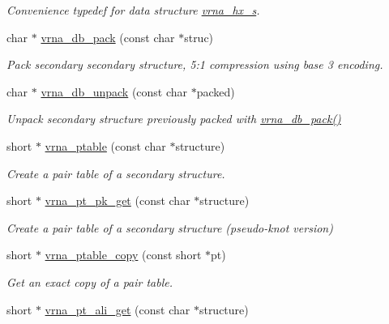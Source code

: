 \begin{DoxyCompactItemize}
\begin{DoxyCompactList}\small\item\em Convenience typedef for data structure \hyperlink{structvrna__hx__s}{vrna\+\_\+hx\+\_\+s}. \end{DoxyCompactList}\item 
char $\ast$ \hyperlink{group__struct__utils_ga55c4783060a1464f862f858d5599c9e1}{vrna\+\_\+db\+\_\+pack} (const char $\ast$struc)
\begin{DoxyCompactList}\small\item\em Pack secondary secondary structure, 5\+:1 compression using base 3 encoding. \end{DoxyCompactList}\item 
char $\ast$ \hyperlink{group__struct__utils_ga6490adff857d84ce06e6f379ae3a4512}{vrna\+\_\+db\+\_\+unpack} (const char $\ast$packed)
\begin{DoxyCompactList}\small\item\em Unpack secondary structure previously packed with \hyperlink{group__struct__utils_ga55c4783060a1464f862f858d5599c9e1}{vrna\+\_\+db\+\_\+pack()} \end{DoxyCompactList}\item 
short $\ast$ \hyperlink{group__struct__utils_gae829fb8bb7f694c12a9c0bbc34c77c60}{vrna\+\_\+ptable} (const char $\ast$structure)
\begin{DoxyCompactList}\small\item\em Create a pair table of a secondary structure. \end{DoxyCompactList}\item 
short $\ast$ \hyperlink{group__struct__utils_gacca520048b24ec5a8978f4dafb4e4bf8}{vrna\+\_\+pt\+\_\+pk\+\_\+get} (const char $\ast$structure)
\begin{DoxyCompactList}\small\item\em Create a pair table of a secondary structure (pseudo-\/knot version) \end{DoxyCompactList}\item 
short $\ast$ \hyperlink{group__struct__utils_ga2daefbbd6d9f8803731651882f54332d}{vrna\+\_\+ptable\+\_\+copy} (const short $\ast$pt)
\begin{DoxyCompactList}\small\item\em Get an exact copy of a pair table. \end{DoxyCompactList}\item 
short $\ast$ \hyperlink{group__struct__utils_ga1ee4cdcda1f57d32dcb38032116d335d}{vrna\+\_\+pt\+\_\+ali\+\_\+get} (const char $\ast$structure)\hypertarget{group__struct__utils_ga1ee4cdcda1f57d32dcb38032116d335d}{}\label{group__struct__utils_ga1ee4cdcda1f57d32dcb38032116d335d}


\end{DoxyCompactItemize}
